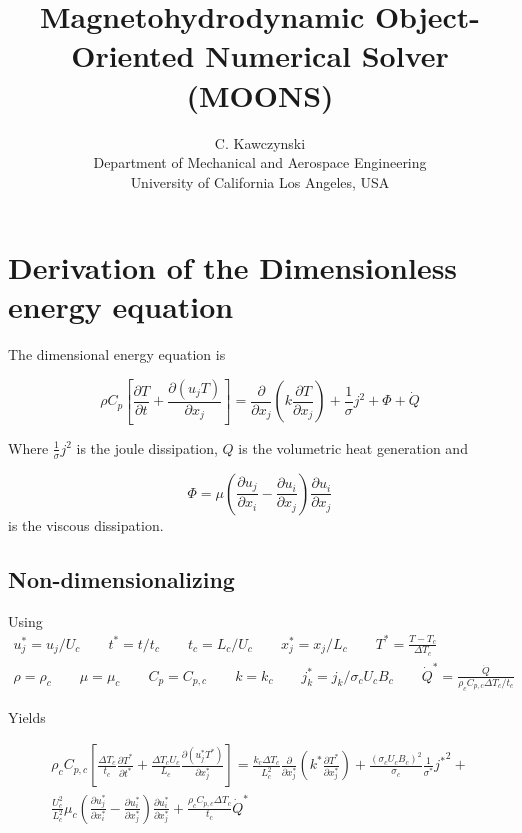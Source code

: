 \documentclass[11pt]{article}
\newcommand{\PD}{\partial}
\begin{document}
\doublespacing
\title{Magnetohydrodynamic Object-Oriented Numerical Solver (MOONS)}
\author{C. Kawczynski \\
Department of Mechanical and Aerospace Engineering \\
University of California Los Angeles, USA\\
}
\maketitle

\section{Derivation of the Dimensionless energy equation}
The dimensional energy equation is

\begin{equation}
\rho C_p \left[ \frac{\PD T}{\PD t} + \frac{\PD (u_j T)}{\PD x_j} \right] = 
\frac{\PD}{\PD x_j} \left( k \frac{\PD T}{\PD x_j} \right) + \frac{1}{\sigma} j^2 + \Phi + \dot{Q}
\end{equation}

Where $\frac{1}{\sigma} j^2$ is the joule dissipation, $Q$ is the volumetric heat generation and

\begin{equation}
\Phi = \mu \left( \frac{\PD u_j}{\PD x_i} - \frac{\PD u_i}{\PD x_j} \right) \frac{\PD u_i}{\PD x_j}
\end{equation}
is the viscous dissipation.

\subsection{Non-dimensionalizing}
Using
\begin{equation}\begin{aligned}
u_j^* = u_j/U_c \qquad t^* = t/t_c \qquad 
t_c = L_c/U_c  \qquad x_j^* = x_j/L_c \qquad 
T^* = \frac{T - T_c}{\Delta T_c} \\
\rho = \rho_c \qquad \mu = \mu_c \qquad
C_p = C_{p,c} \qquad k = k_c \qquad
j_k^* = j_k/ \sigma_c U_c B_c \qquad
\dot{Q}^* = \frac{\dot{Q}}{\rho_c C_{p,c} \Delta T_c / t_c}
\end{aligned}\end{equation}

Yields

\begin{multline}
	\rho_c C_{p,c}
	\left[
	\frac{\Delta T_c}{t_c} \frac{\PD T^*}{\PD t^*} + \frac{\Delta T_c U_c}{L_c} \frac{\PD (u_j^* T^*)}{\PD x_j^*}
	\right]
	= 
	\frac{k_c \Delta T_c}{L_c^2}
	\frac{\PD}{\PD x_j^*}
	\left( k^* \frac{\PD T^*}{\PD x_j^*} \right) +
	\frac{(\sigma_c U_c B_c)^2}{\sigma_c}
	\frac{1}{\sigma^*} {j^*}^2 + \\
	\frac{U_c^2}{L_c^2}\mu_c
	\left( \frac{\PD u_j^*}{\PD x_i^*} - \frac{\PD u_i^*}{\PD x_j^*} \right)
	\frac{\PD u_i^*}{\PD x_j^*} +
	\frac{\rho_c C_{p,c} \Delta T_c}{t_c}
	\dot{Q}^*
\end{multline}
\end{document}

